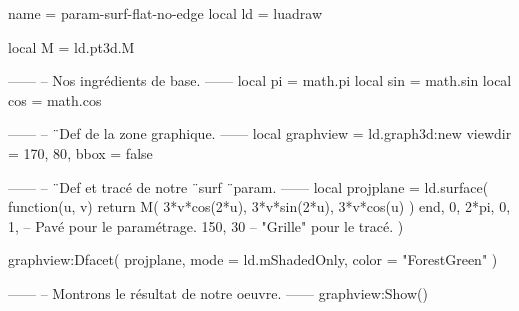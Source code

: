 \documentclass[border = 3pt]{standalone}
\begin{document}
\begin{luadraw*}{name = param-surf-flat-no-edge}
local ld = luadraw

local M = ld.pt3d.M

------
-- Nos ingrédients de base.
------
local pi  = math.pi
local sin = math.sin
local cos = math.cos

------
-- ¨Def de la zone graphique.
------
local graphview = ld.graph3d:new{
  viewdir = {170, 80},
  bbox    = false
}

------
-- ¨Def et tracé de notre ¨surf ¨param.
------
local projplane = ld.surface(
  function(u, v)
    return M(
      3*v*cos(2*u),
      3*v*sin(2*u),
      3*v*cos(u)
    )
  end,
  0, 2*pi, 0, 1,  -- Pavé pour le paramétrage.
  {150, 30}       -- "Grille" pour le tracé.
)

graphview:Dfacet(
  projplane,
  {
    mode  = ld.mShadedOnly,
    color = "ForestGreen"
  }
)

------
-- Montrons le résultat de notre oeuvre.
------
graphview:Show()
\end{luadraw*}
\end{document}
